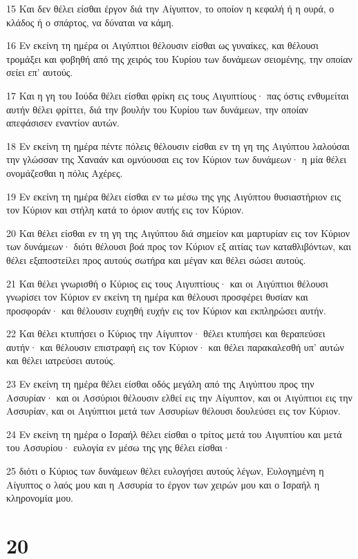 \par 15 Και δεν θέλει είσθαι έργον διά την Αίγυπτον, το οποίον η κεφαλή ή η ουρά, ο κλάδος ή ο σπάρτος, να δύναται να κάμη.
\par 16 Εν εκείνη τη ημέρα οι Αιγύπτιοι θέλουσιν είσθαι ως γυναίκες, και θέλουσι τρομάξει και φοβηθή από της χειρός του Κυρίου των δυνάμεων σειομένης, την οποίαν σείει επ' αυτούς.
\par 17 Και η γη του Ιούδα θέλει είσθαι φρίκη εις τους Αιγυπτίους· πας όστις ενθυμείται αυτήν θέλει φρίττει, διά την βουλήν του Κυρίου των δυνάμεων, την οποίαν απεφάσισεν εναντίον αυτών.
\par 18 Εν εκείνη τη ημέρα πέντε πόλεις θέλουσιν είσθαι εν τη γη της Αιγύπτου λαλούσαι την γλώσσαν της Χαναάν και ομνύουσαι εις τον Κύριον των δυνάμεων· η μία θέλει ονομάζεσθαι η πόλις Αχέρες.
\par 19 Εν εκείνη τη ημέρα θέλει είσθαι εν τω μέσω της γης Αιγύπτου θυσιαστήριον εις τον Κύριον και στήλη κατά το όριον αυτής εις τον Κύριον.
\par 20 Και θέλει είσθαι εν τη γη της Αιγύπτου διά σημείον και μαρτυρίαν εις τον Κύριον των δυνάμεων· διότι θέλουσι βοά προς τον Κύριον εξ αιτίας των καταθλιβόντων, και θέλει εξαποστείλει προς αυτούς σωτήρα και μέγαν και θέλει σώσει αυτούς.
\par 21 Και θέλει γνωρισθή ο Κύριος εις τους Αιγυπτίους· και οι Αιγύπτιοι θέλουσι γνωρίσει τον Κύριον εν εκείνη τη ημέρα και θέλουσι προσφέρει θυσίαν και προσφοράν· και θέλουσιν ευχηθή ευχήν εις τον Κύριον και εκπληρώσει αυτήν.
\par 22 Και θέλει κτυπήσει ο Κύριος την Αίγυπτον· θέλει κτυπήσει και θεραπεύσει αυτήν· και θέλουσιν επιστραφή εις τον Κύριον· και θέλει παρακαλεσθή υπ' αυτών και θέλει ιατρεύσει αυτούς.
\par 23 Εν εκείνη τη ημέρα θέλει είσθαι οδός μεγάλη από της Αιγύπτου προς την Ασσυρίαν· και οι Ασσύριοι θέλουσιν ελθεί εις την Αίγυπτον, και οι Αιγύπτιοι εις την Ασσυρίαν, και οι Αιγύπτιοι μετά των Ασσυρίων θέλουσι δουλεύσει εις τον Κύριον.
\par 24 Εν εκείνη τη ημέρα ο Ισραήλ θέλει είσθαι ο τρίτος μετά του Αιγυπτίου και μετά του Ασσυρίου· ευλογία εν μέσω της γης θέλει είσθαι·
\par 25 διότι ο Κύριος των δυνάμεων θέλει ευλογήσει αυτούς λέγων, Ευλογημένη η Αίγυπτος ο λαός μου και η Ασσυρία το έργον των χειρών μου και ο Ισραήλ η κληρονομία μου.

\chapter{20}

